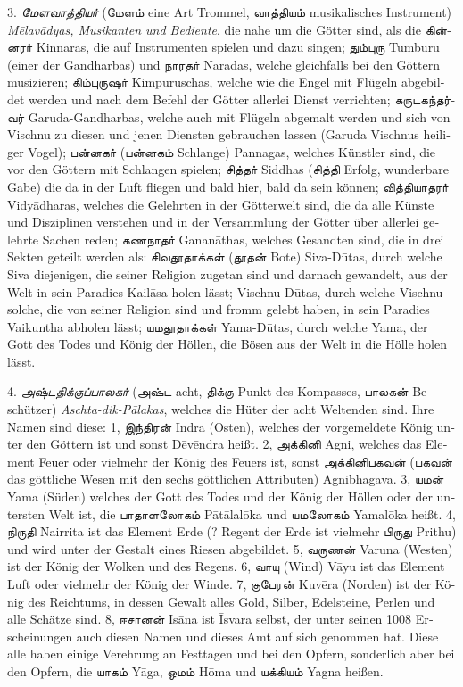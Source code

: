 \documentclass{article}
\newcommand{\TamilText}[1]{\texttamil{#1}}
\newcommand{\TamilItalic}[1]{\texttamil{\emph{#1}}}
\newcommand{\tam}[1]{\TamilText{#1}}
\newcommand{\tamitalic}[1]{\TamilItalic{#1}}
\begin{document}
{3. \tamitalic{மேளவாத்தியா்} (\tam{மேளம்} \textgerman{eine Art Trommel, \tam{வாத்தியம்} musikalisches Instrument) \emph{M\={e}lav\={a}dyas, Musikanten und Bediente}, die nahe um die Götter sind, als die \tam{கின்னரா்} Kinnaras, die auf Instrumenten spielen und dazu singen; \tam{தும்புரு} Tumburu (einer der Gandharbas) und \tam{நாரதா்} N\={a}radas, welche gleichfalls bei den Göttern musizieren; \tam{கிம்புருஷா்} Kimpuruschas, welche wie die Engel mit Flügeln abgebildet werden und nach dem Befehl der Götter allerlei Dienst verrichten; \tam{கருடகந்தர்வர்} Garuda-Gandharbas, welche auch mit Flügeln abgemalt werden und sich von Vischnu zu diesen und jenen Diensten gebrauchen lassen (Garuda Vischnus heiliger Vogel); \tam{பன்னகா்} (\tam{பன்னகம்} Schlange) Pannagas, welches Künstler sind, die vor den Göttern mit Schlangen spielen; \tam{சித்தா்} Siddhas (\tam{சித்தி} Erfolg, wunderbare Gabe) die da in der Luft fliegen und bald hier, bald da sein können; \tam{வித்தியாதரா்} Vidy\={a}dharas, welches die Gelehrten in der Götterwelt sind, die da alle Künste und Disziplinen verstehen und in der Versammlung der Götter über allerlei gelehrte Sachen reden; \tam{கணநாதா்} Ganan\={a}thas, welches Gesandten sind, die in drei Sekten geteilt werden als: \tam{சிவதூதாக்கள்} (\tam{தூதன்} Bote) Siva-D\={u}tas, durch welche Siva diejenigen, die seiner Religion zugetan sind und darnach gewandelt, aus der Welt in sein Paradies Kail\={a}sa holen lässt; Vischnu-D\={u}tas, durch welche Vischnu solche, die von seiner Religion sind und fromm gelebt haben, in sein Paradies Vaikuntha abholen lässt; \tam{யமதூதாக்கள்} Yama-D\={u}tas, durch welche Yama, der Gott des Todes und König der Höllen, die Bösen aus der Welt in die Hölle holen lässt.}

4. \tamitalic{அஷ்டதிக்குப்பாலகா்} \textgerman{(\tam{அஷ்ட} acht, \tam{திக்கு} Punkt des Kompasses, \tam{பாலகன்} Beschützer) \emph{Aschta-dik-P\={a}lakas}, welches die Hüter der acht Weltenden sind. Ihre Namen sind diese: 1, \tam{இந்திரன்} Indra (Osten), welches der vorgemeldete König unter den Göttern ist und sonst D\={e}v\={e}ndra heißt. 2, \tam{அக்கினி} Agni, welches das Element Feuer oder vielmehr der König des Feuers ist, sonst \tam{அக்கினிபகவன்} (\tam{பகவன்} das göttliche Wesen mit den sechs göttlichen Attributen) Agnibhagava. 3, \tam{யமன்} Yama (Süden) welches der Gott des Todes und der König der Höllen oder der untersten Welt ist, die \tam{பாதாளலோகம்} P\={a}t\={a}lal\={o}ka und \tam{யமலோகம்} Yamal\={o}ka heißt. 4, \tam{நிருதி} Nairrita ist das Element Erde (? Regent der Erde ist vielmehr \tam{பிருது} Prithu) und wird unter der Gestalt eines Riesen abgebildet. 5, \tam{வருணன்} Varuna (Westen) ist der König der Wolken und des Regens. 6, \tam{வாயு} (Wind) V\={a}yu ist das Element Luft oder vielmehr der König der Winde. 7, \tam{குபேரன்} Kuv\={e}ra (Norden) ist der König des Reichtums, in dessen Gewalt alles Gold, Silber, Edelsteine, Perlen und alle Schätze sind. 8, \tam{ஈசானன்} Is\={a}na ist \={I}svara selbst, der unter seinen 1008 Erscheinungen auch diesen Namen und dieses Amt auf sich genommen hat. Diese alle haben einige Verehrung an Festtagen und bei den Opfern, sonderlich aber bei den Opfern, die \tam{யாகம்} Y\={a}ga, \tam{ஒமம்} H\={o}ma und \tam{யக்கியம்} Yagna heißen.}

\clearpage
}
\end{document}

